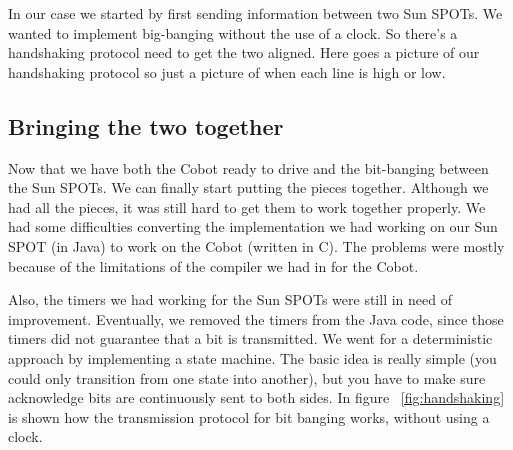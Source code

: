 \documentclass[a4paper,10pt]{article} %
\begin{document}
In our case we started by first sending information between two Sun SPOTs. We
wanted to implement big-banging without the use of a clock. So there's a
handshaking protocol need to get the two aligned. Here goes a picture of our
handshaking protocol so just a picture of when each line is high or low.


\subsection{Bringing the two together} %
\label{subsec:together}

Now that we have both the Cobot ready to drive and the bit-banging between the
Sun SPOTs. We can finally start putting the pieces together. Although we had all
the pieces, it was still hard to get them to work together properly. We had some
difficulties converting the implementation we had working on our Sun SPOT (in
Java) to work on the Cobot (written in C). The problems were mostly because of
the limitations of the compiler we had in for the Cobot.

Also, the timers we had working for the Sun SPOTs were still in need of
improvement. Eventually, we removed the timers from the Java code, since those
timers did not guarantee that a bit is transmitted. We went for a deterministic
approach by implementing a state machine. The basic idea is really simple (you
could only transition from one state into another), but you have to make sure
acknowledge bits are continuously sent to both sides. In figure
~\ref{fig:handshaking} is shown how the transmission protocol for bit banging
works, without using a clock.
\end{document}

